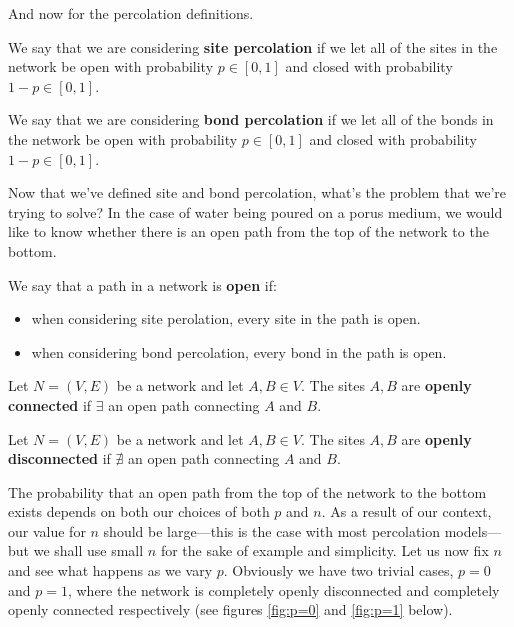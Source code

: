 And now for the percolation definitions.

\begin{definition}\label{def:sitepercolation}
  We say that we are considering \textbf{site percolation} if we let all of the sites in the network be open with probability $p \in [0, 1]$ and closed with probability $1-p \in [0, 1]$.
\end{definition}
\begin{definition}\label{def:bondpercolation}
  We say that we are considering \textbf{bond percolation} if we let all of the bonds in the network be open with probability $p \in [0, 1]$ and closed with probability $1-p \in [0, 1]$.
\end{definition}

Now that we've defined site and bond percolation, what's the problem that we're trying to solve? In the case of water being poured on a porus medium, we would like to know
whether there is an open path from the top of the network to the bottom.

\begin{definition}\label{def:open}
  We say that a path in a network is \textbf{open} if:
  \begin{itemize}
    \item when considering site perolation, every site in the path is open.
    \item when considering bond percolation, every bond in the path is open.
  \end{itemize}
\end{definition}

\begin{definition}\label{def:openly connected}
  Let $N=(V, E)$ be a network and let $A, B \in V$. The sites $A, B$ are \textbf{openly connected} if $\exists$ an open path connecting $A$ and $B$.
\end{definition}

\begin{definition}\label{def:openly disconnected}
  Let $N=(V, E)$ be a network and let $A, B \in V$. The sites $A, B$ are \textbf{openly disconnected} if $\nexists$ an open path connecting $A$ and $B$.
\end{definition}

The probability that an open path from the top of the network to the bottom exists depends on both our choices of both $p$ and $n$. As a result of our context, our value for $n$ should be
large---this is the case with most percolation models---but we shall use small $n$ for the sake of example and simplicity. Let us now fix $n$ and see what happens as we vary $p$. Obviously we have two trivial cases, $p=0$ and $p=1$,
where the network is completely openly disconnected and completely openly connected respectively (see
figures \ref{fig:p=0} and \ref{fig:p=1} below).

